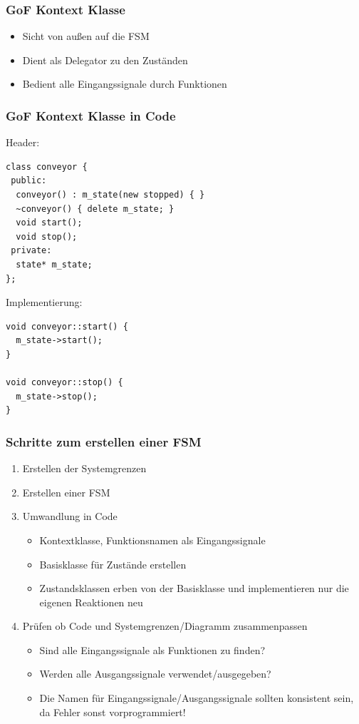 \documentclass{beamer}
\begin{document}
\begin{frame}
 \frametitle{GoF Kontext Klasse}
 \begin{itemize}
  \item Sicht von au{\ss}en auf die FSM
  \item Dient als Delegator zu den Zust\"anden
  \item Bedient alle Eingangssignale durch Funktionen
 \end{itemize}
\end{frame}

\begin{frame}[fragile]
 \frametitle{GoF Kontext Klasse in Code}
 Header:
 \begin{lstlisting}
class conveyor {
 public:
  conveyor() : m_state(new stopped) { }
  ~conveyor() { delete m_state; }
  void start();
  void stop();
 private:
  state* m_state;
};
 \end{lstlisting}
 Implementierung:
 \begin{lstlisting}
void conveyor::start() {
  m_state->start();
}

void conveyor::stop() {
  m_state->stop();
}
 \end{lstlisting}
\end{frame}

\begin{frame}
 \frametitle{Schritte zum erstellen einer FSM}
 \begin{enumerate}
  \item Erstellen der Systemgrenzen
  \item Erstellen einer FSM
  \item Umwandlung in Code
  \begin{itemize}
   \item Kontextklasse, Funktionsnamen als Eingangssignale
   \item Basisklasse f\"ur Zust\"ande erstellen
   \item Zustandsklassen erben von der Basisklasse und implementieren nur die eigenen Reaktionen neu
  \end{itemize}
  \item Pr\"ufen ob Code und Systemgrenzen/Diagramm zusammenpassen
  \begin{itemize}
   \item Sind alle Eingangssignale als Funktionen zu finden?
   \item Werden alle Ausgangssignale verwendet/ausgegeben?
   \item Die Namen f\"ur Eingangssignale/Ausgangssignale sollten konsistent sein, da Fehler sonst vorprogrammiert!
  \end{itemize}
 \end{enumerate}
\end{frame}
\end{document}

